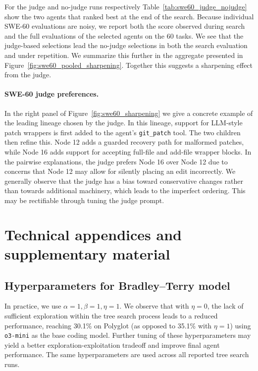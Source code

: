 \documentclass{article}
\begin{document}
For the judge and no-judge runs respectively Table~\ref{tab:swe60_judge_nojudge} show the two agents that ranked best at the end of the search.
Because individual SWE-60 evaluations are noisy, we report both the score observed during search and the full evaluations of the selected agents on the 60 tasks. 
We see that the judge-based selections lead the no-judge selections in both the search evaluation and under repetition.
We summarize this further in the aggregate presented in Figure~\ref{fig:swe60_pooled_sharpening}.
Together this suggests a sharpening effect from the judge.

\paragraph{SWE-60 judge preferences.}
In the right panel of Figure~\ref{fig:swe60_sharpening} we give a concrete example of the leading lineage chosen by the judge. 
In this lineage, support for LLM-style patch wrappers is first added to the agent's \texttt{git\_patch} tool. 
The two children then refine this.
Node 12 adds a guarded recovery path for malformed patches, while Node 16 adds support for accepting full-file and add-file wrapper blocks.
In the pairwise explanations, the judge prefers Node 16 over Node 12 due to concerns that Node 12 may allow for silently placing an edit incorrectly.
We generally observe that the judge has a bias toward conservative changes rather than towards additional machinery, which leads to the imperfect ordering.
This may be rectifiable through tuning the judge prompt.


\section{Technical appendices and supplementary material}



\subsection{Hyperparameters for Bradley–Terry model}
In practice, we use $\alpha = 1, \beta = 1, \eta  = 1$. 
We observe that with $\eta = 0$, the lack of sufficient exploration within the tree search process leads to a reduced performance, reaching 30.1\% on Polyglot (as opposed to 35.1\% with $\eta = 1$) using \texttt{o3-mini} as the base coding model. 
Further tuning of these hyperparameters may yield a better exploration-exploitation tradeoff and improve final agent performance.
The same hyperparameters are used across all reported tree search runs.
\end{document}
